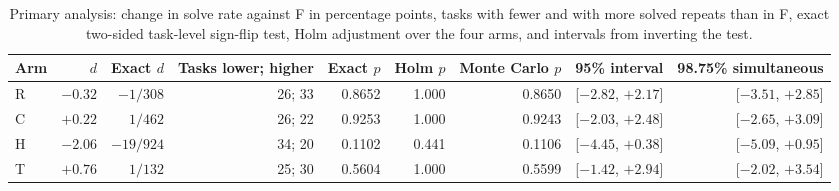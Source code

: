 \begin{table}[!htb]
\centering
\caption{Primary analysis: change in solve rate against F in percentage points, tasks with fewer and with more solved repeats than in F, exact two-sided task-level sign-flip test, Holm adjustment over the four arms, and intervals from inverting the test.}\label{tab:s-primary}
\footnotesize\setlength{\tabcolsep}{4pt}
\begin{tabular}{lrrrrrrrr}
\toprule
Arm & $d$ & Exact $d$ & \parbox[b]{1.5cm}{\raggedleft Tasks lower; higher} & Exact $p$ & Holm $p$ & \parbox[b]{1.7cm}{\raggedleft Monte Carlo $p$} & 95\% interval & 98.75\% simultaneous \\
\midrule
R & ${-}0.32$ & ${-}1/308$ & 26; 33 & 0.8652 & 1.000 & 0.8650 & [${-}2.82$, ${+}2.17$] & [${-}3.51$, ${+}2.85$] \\
C & ${+}0.22$ & $1/462$ & 26; 22 & 0.9253 & 1.000 & 0.9243 & [${-}2.03$, ${+}2.48$] & [${-}2.65$, ${+}3.09$] \\
H & ${-}2.06$ & ${-}19/924$ & 34; 20 & 0.1102 & 0.441 & 0.1106 & [${-}4.45$, ${+}0.38$] & [${-}5.09$, ${+}0.95$] \\
T & ${+}0.76$ & $1/132$ & 25; 30 & 0.5604 & 1.000 & 0.5599 & [${-}1.42$, ${+}2.94$] & [${-}2.02$, ${+}3.54$] \\
\bottomrule
\end{tabular}
\end{table}

